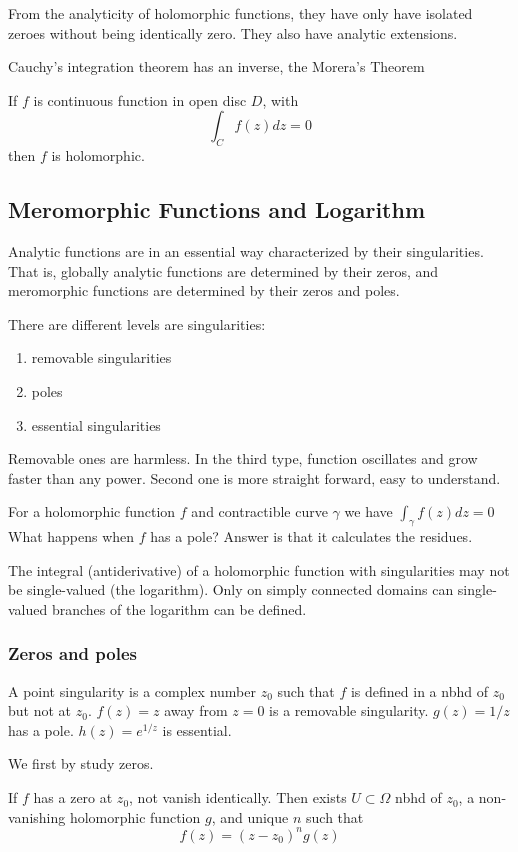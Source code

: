 \documentclass[main.tex]{subfiles}
\begin{document}
From the analyticity of holomorphic functions, they have only have isolated zeroes without being identically zero. They also have analytic extensions.

Cauchy's integration theorem has an inverse, the Morera's Theorem
\begin{theorem}
If $f$ is continuous function in open disc $D$, with 
$$
\int_C f(z) dz = 0
$$
then $f$ is holomorphic.
\end{theorem}


\subsection{Meromorphic Functions and Logarithm}

Analytic functions are in an essential way characterized by their singularities. That is, globally analytic functions are determined by their zeros, and meromorphic functions are determined by their zeros and poles. 

There are different levels are singularities:
\begin{enumerate}
    \item removable singularities
    \item poles
    \item essential singularities
\end{enumerate}
Removable ones are harmless. In the third type, function oscillates and grow faster than any power. Second one is more straight forward, easy to understand.

For a holomorphic function $f$ and contractible curve $\gamma$ we have 
$
\int_\gamma f(z) dz = 0
$
What happens when $f$ has a pole? Answer is that it calculates the residues.

The integral (antiderivative) of a holomorphic function with singularities may not be single-valued (the logarithm). Only on simply connected domains can single-valued branches of the logarithm can be defined.

\subsubsection{Zeros and poles}
A point singularity is a complex number $z_0$ such that $f$ is defined in a nbhd of $z_0$ but not at $z_0$. $f(z) = z$ away from $z = 0$ is a removable singularity. $g(z) = 1/z$ has a pole. $h(z) = e^{1/z}$ is essential.

We first by study zeros. 
\begin{theorem}
If $f$ has a zero at $z_0$, not vanish identically. Then exists $U \subset \Omega$ nbhd of $z_0$, a non-vanishing holomorphic function $g$, and unique $n$ such that 
$$
f(z) = (z - z_0)^n g(z)
$$
\end{theorem}
\end{document}
